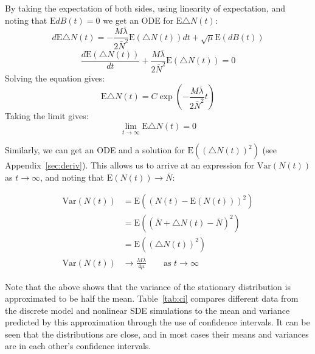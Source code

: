 \documentclass[titlepage]{article}
\newcommand{\var}{\textrm{Var}}
\newcommand{\E}{\textrm{E}}
\begin{document}
By taking the expectation of both sides, using linearity of expectation, and noting that $\E dB(t) = 0$ we get an ODE for $\E \triangle N(t)$:
\begin{equation*}
d \E \triangle N(t) =
-\frac{M\bar\lambda}{2\bar{N}^2} \E( \triangle N(t) )dt + \sqrt{\mu} \E( dB(t) )
\end{equation*}
\begin{equation*}
\frac{d \E( \triangle N(t) )}{dt} +
\frac{M\bar\lambda}{2\bar{N}^2} \E( \triangle N(t) )
= 0
\end{equation*}
Solving the equation gives:
\begin{equation*}
\E \triangle N(t) = C \exp \left( -\frac{M\bar\lambda}{2\bar{N}^2} t \right)
\end{equation*}
Taking the limit gives:
\begin{equation*}
\lim_{t \rightarrow \infty} \E \triangle N(t) = 0
\end{equation*}

Similarly, we can get an ODE and a solution for $\E( (\triangle N(t))^2 )$ (see Appendix~\ref{sec:deriv}).
This allows us to arrive at an expression for $\var( N(t) )$ as $t \rightarrow \infty$, and noting that $\E(N(t)) \rightarrow \bar{N}$:

\begin{align*}
\var( N(t) ) &= \E( ( N(t) - \E(N(t)) )^2 ) \\
&= \E( ( \bar{N} + \triangle N(t) - \bar{N} )^2 ) \\
&= \E( (\triangle N(t))^2 ) \\
\var( N(t) ) &\rightarrow \frac{M \bar{\lambda}}{4 \mu}
\qquad \textrm{as } t \rightarrow \infty
\end{align*}

Note that the above shows that the variance of the stationary distribution is approximated to be half the mean.
Table~\ref{tab:ci} compares different data from the discrete model and nonlinear SDE simulations to the mean and variance predicted by this approximation through the use of confidence intervals.
It can be seen that the distributions are close, and in most cases their means and variances are in each other's confidence intervals.
\end{document}
